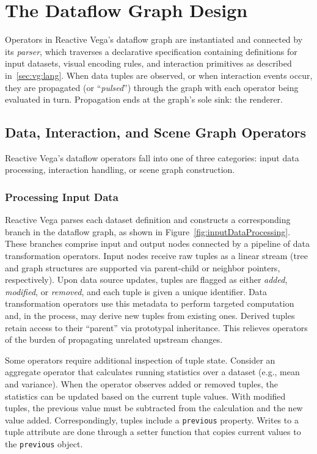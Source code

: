 \section{The Dataflow Graph Design}
\label{sec:vg:dataflow}

Operators in Reactive Vega's dataflow graph are instantiated and connected by
its \emph{parser}, which traverses a declarative specification containing
definitions for input datasets, visual encoding rules, and interaction
primitives as described in~\cref{sec:vg:lang}. When data tuples are observed, or
when interaction events occur, they are propagated (or ``\emph{pulsed}'')
through the graph with each operator being evaluated in turn. Propagation ends
at the graph's sole sink: the renderer.

\subsection{Data, Interaction, and Scene Graph Operators}

Reactive Vega's dataflow operators fall into one of three categories: input data
processing, interaction handling, or scene graph construction.

\subsubsection{Processing Input Data}

Reactive Vega parses each dataset definition and constructs a corresponding
branch in the dataflow graph, as shown in
Figure~\ref{fig:inputDataProcessing}. These branches comprise input and output
nodes connected by a pipeline of data transformation operators. Input nodes
receive raw tuples as a linear stream (tree and graph structures are supported
via parent-child or neighbor pointers, respectively). Upon data source
updates, tuples are flagged as either \emph{added}, \emph{modified}, or
\emph{removed}, and each tuple is given a unique identifier. Data
transformation operators use this metadata to perform targeted computation
and, in the process, may derive new tuples from existing ones. Derived tuples
retain access to their ``parent'' via prototypal inheritance. This relieves
operators of the burden of propagating unrelated upstream changes.

Some operators require additional inspection of tuple state. Consider an
aggregate operator that calculates running statistics over a dataset (e.g.,
mean and variance). When the operator observes added or removed tuples, the
statistics can be updated based on the current tuple values. With modified
tuples, the previous value must be subtracted from the calculation and the new
value added. Correspondingly, tuples include a \texttt{previous} property.
Writes to a tuple attribute are done through a setter function that copies
current values to the \texttt{previous} object.

